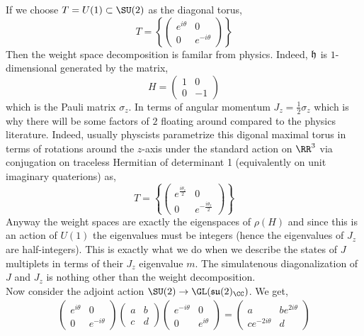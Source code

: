 \documentclass[12pt]{article}
\begin{document}
\newcommand{\su}{\mathfrak{su}}

If we choose $T = U(1) \subset \SU(2)$ as the diagonal torus,
\[ T = \left\{ 
\begin{pmatrix}
e^{i \theta} & 0
\\
0 & e^{-i\theta} 
\end{pmatrix} \right\} \]
Then the weight space decomposition is familar from physics. Indeed, $\mathfrak{h}$ is $1$-dimensional generated by the matrix,
\[ H = \begin{pmatrix}
1 & 0 
\\
0 & -1 
\end{pmatrix} \]
which is the Pauli matrix $\sigma_z$. In terms of angular momentum $J_z = \tfrac{1}{2} \sigma_z$ which is why there will be some factors of $2$ floating around compared to the physics literature. Indeed, usually physcists parametrize this digonal maximal torus in terms of rotations around the $z$-axis under the standard action on $\RR^3$ via conjugation on traceless Hermitian of determinant 1 (equivalently on unit imaginary quaterions) as,
\[ T = \left\{ 
\begin{pmatrix}
e^{\frac{i \theta_z}{2}} & 0
\\
0 & e^{-\frac{i \theta_z}{2}} 
\end{pmatrix} \right\} \]
Anyway the weight spaces are exactly the eigenspaces of $\rho(H)$ and since this is an action of $U(1)$ the eigenvalues must be integers (hence the eigenvalues of $J_z$ are half-integers). This is exactly what we do when we describe the states of $J$ multiplets in terms of their $J_z$ eigenvalue $m$. The simulatenous diagonalization of $J$ and $J_z$ is nothing other than the weight decomposition. 
\bigskip\\
Now consider the adjoint action $\SU(2) \to \GL(\su(2)_{\CC})$. We get,
\begin{align*}
\begin{pmatrix}
e^{i \theta} & 0
\\
0 & e^{-i\theta} 
\end{pmatrix}
\begin{pmatrix}
a & b
\\
c & d
\end{pmatrix}
\begin{pmatrix}
e^{-i \theta} & 0
\\
0 & e^{i\theta} 
\end{pmatrix}
= 
\begin{pmatrix}
a & b e^{2i \theta}
\\
c e^{-2i \theta} & d
\end{pmatrix}
\end{align*} 
\end{document}
